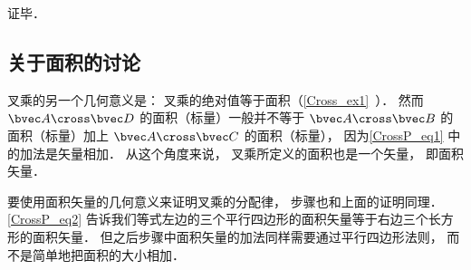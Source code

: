 证毕．

\subsection{关于面积的讨论}
叉乘的另一个几何意义是： 叉乘的绝对值等于面积（\autoref{Cross_ex1}~）． 然而 $\bvec A \cross \bvec D$ 的面积（标量）一般并不等于 $\bvec A \cross \bvec B$ 的面积（标量）加上 $\bvec A \cross \bvec C$ 的面积（标量）， 因为\autoref{CrossP_eq1} 中的加法是矢量相加． 从这个角度来说， 叉乘所定义的面积也是一个矢量， 即面积矢量．

要使用面积矢量的几何意义来证明叉乘的分配律， 步骤也和上面的证明同理． \autoref{CrossP_eq2} 告诉我们等式左边的三个平行四边形的面积矢量等于右边三个长方形的面积矢量． 但之后步骤中面积矢量的加法同样需要通过平行四边形法则， 而不是简单地把面积的大小相加．
